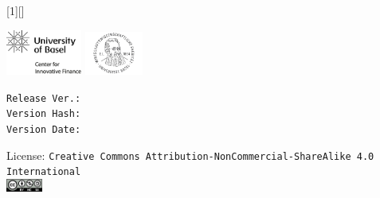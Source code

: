 [1][]
{
  \vspace{-0cm}\hfill\includegraphics[width=2.5cm]{../config/logo_cif}
  \includegraphics[width=1.9cm]{../config/seal_wwz}
  \\ \vspace{2em}
  \textbf{\inserttitle}\par
  \insertsubtitle\par  \vspace{1.5em}
  \small{}\insertauthor\par
  \insertinstitute\par \vspace{2em}
  \inserttitlegraphic
    \tiny \noindent \texttt{Release Ver.: \gitRelease}\\ 
    \texttt{Version Hash: \gitSHA}\\
    \texttt{Version Date: \gitDate}\\ \vspace{1em}
    
    

  
  \vspace{1em}
  License: \texttt{Creative Commons Attribution-NonCommercial-ShareAlike 4.0 International}\\\vspace{2em}
  \includegraphics[width = 1.2cm]{../config/license}
}


\usetikzlibrary{decorations.pathreplacing}
\usetikzlibrary{decorations.markings}
\usetikzlibrary{positioning}
\captionsetup{font=footnotesize}
